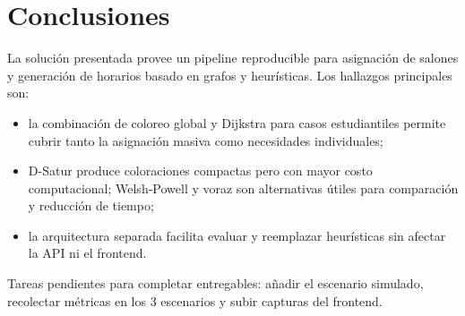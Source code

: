 \chapter{Conclusiones}

La solución presentada provee un pipeline reproducible para asignación de salones y generación de horarios basado en grafos y heurísticas. Los hallazgos principales son:

\begin{itemize}[leftmargin=1.5cm]
  \item la combinación de coloreo global y Dijkstra para casos estudiantiles permite cubrir tanto la asignación masiva como necesidades individuales;
  \item D-Satur produce coloraciones compactas pero con mayor costo computacional; Welsh‑Powell y voraz son alternativas útiles para comparación y reducción de tiempo;
  \item la arquitectura separada facilita evaluar y reemplazar heurísticas sin afectar la API ni el frontend.
\end{itemize}

Tareas pendientes para completar entregables: añadir el escenario simulado, recolectar métricas en los 3 escenarios y subir capturas del frontend.

